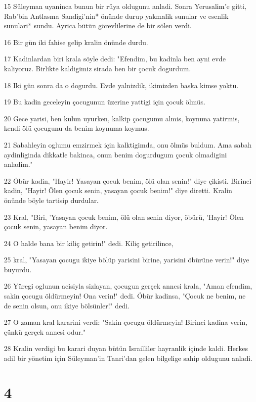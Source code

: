 \par 15 Süleyman uyaninca bunun bir rüya oldugunu anladi. Sonra Yerusalim'e gitti, Rab'bin Antlasma Sandigi'nin* önünde durup yakmalik sunular ve esenlik sunulari* sundu. Ayrica bütün görevlilerine de bir sölen verdi.
\par 16 Bir gün iki fahise gelip kralin önünde durdu.
\par 17 Kadinlardan biri krala söyle dedi: "Efendim, bu kadinla ben ayni evde kaliyoruz. Birlikte kaldigimiz sirada ben bir çocuk dogurdum.
\par 18 Iki gün sonra da o dogurdu. Evde yalnizdik, ikimizden baska kimse yoktu.
\par 19 Bu kadin geceleyin çocugunun üzerine yattigi için çocuk ölmüs.
\par 20 Gece yarisi, ben kulun uyurken, kalkip çocugumu almis, koynuna yatirmis, kendi ölü çocugunu da benim koynuma koymus.
\par 21 Sabahleyin oglumu emzirmek için kalktigimda, onu ölmüs buldum. Ama sabah aydinliginda dikkatle bakinca, onun benim dogurdugum çocuk olmadigini anladim."
\par 22 Öbür kadin, "Hayir! Yasayan çocuk benim, ölü olan senin!" diye çikisti. Birinci kadin, "Hayir! Ölen çocuk senin, yasayan çocuk benim!" diye diretti. Kralin önünde böyle tartisip durdular.
\par 23 Kral, "Biri, 'Yasayan çocuk benim, ölü olan senin diyor, öbürü, 'Hayir! Ölen çocuk senin, yasayan benim diyor.
\par 24 O halde bana bir kiliç getirin!" dedi. Kiliç getirilince,
\par 25 kral, "Yasayan çocugu ikiye bölüp yarisini birine, yarisini öbürüne verin!" diye buyurdu.
\par 26 Yüregi oglunun acisiyla sizlayan, çocugun gerçek annesi krala, "Aman efendim, sakin çocugu öldürmeyin! Ona verin!" dedi. Öbür kadinsa, "Çocuk ne benim, ne de senin olsun, onu ikiye bölsünler!" dedi.
\par 27 O zaman kral kararini verdi: "Sakin çocugu öldürmeyin! Birinci kadina verin, çünkü gerçek annesi odur."
\par 28 Kralin verdigi bu karari duyan bütün Israilliler hayranlik içinde kaldi. Herkes adil bir yönetim için Süleyman'in Tanri'dan gelen bilgelige sahip oldugunu anladi.

\chapter{4}

